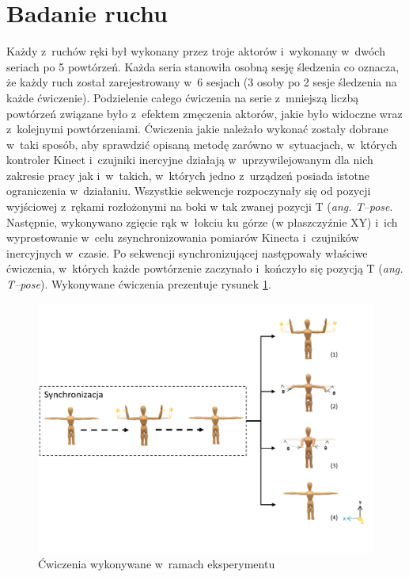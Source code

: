 \section{Badanie ruchu}

Każdy z~ruchów ręki był wykonany przez troje aktorów i~wykonany w~dwóch seriach po 5 powtórzeń. Każda seria stanowiła osobną sesję śledzenia co oznacza, że każdy ruch został zarejestrowany w~6 sesjach (3 osoby po 2 sesje śledzenia na każde ćwiczenie). Podzielenie całego ćwiczenia na serie z~mniejszą liczbą powtórzeń związane było z~efektem zmęczenia aktorów, jakie było widoczne wraz z~kolejnymi powtórzeniami. Ćwiczenia jakie należało wykonać zostały dobrane w~taki sposób, aby sprawdzić opisaną metodę zarówno w~sytuacjach, w~których kontroler Kinect i~czujniki inercyjne działają w~uprzywilejowanym dla nich zakresie pracy jak i~w~takich, w~których jedno z~urządzeń posiada istotne ograniczenia w~działaniu. Wszystkie sekwencje rozpoczynały się od pozycji wyjściowej z~rękami rozłożonymi na boki w tak zwanej pozycji T (\emph{ang. T--pose}. Następnie, wykonywano zgięcie rąk w~łokciu ku górze (w płaszczyźnie XY) i~ich wyprostowanie w~celu zsynchronizowania pomiarów Kinecta i~czujników inercyjnych w~czasie. Po sekwencji synchronizującej następowały właściwe ćwiczenia, w~których każde powtórzenie zaczynało i~kończyło się pozycją T (\emph{ang. T--pose}). Wykonywane ćwiczenia prezentuje rysunek \ref{fig:experiments:poses}.

\begin{figure}[!htp]
	\centering
	\includegraphics[width=\textwidth]{images/poses.png}
	\caption{Ćwiczenia wykonywane w~ramach eksperymentu}
	\label{fig:experiments:poses}
\end{figure}

